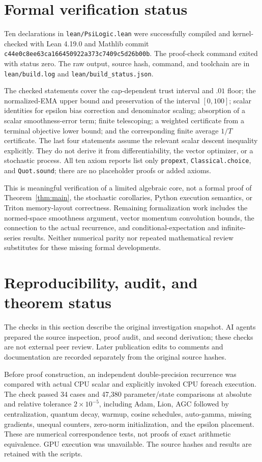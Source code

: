 \documentclass[11pt]{article}
\theoremstyle{definition}
\theoremstyle{remark}
\begin{document}
\section{Formal verification status}\label{sec:formal}
Ten declarations in \texttt{lean/PsiLogic.lean} were successfully compiled and
kernel-checked with Lean 4.19.0 and Mathlib commit
\texttt{c44e0c8ee63ca166450922a373c7409c5d26b00b}. The proof-check command exited
with status zero. The raw output, source hash, command, and toolchain are in
\texttt{lean/build.log} and \texttt{lean/build\_status.json}.

The checked statements cover the cap-dependent trust interval and $.01$ floor;
the normalized-EMA upper bound and preservation of the interval $[0,100]$;
scalar identities for epsilon bias correction and denominator scaling;
absorption of a scalar smoothness-error term; finite telescoping; a weighted
certificate from a terminal objective lower bound; and the corresponding finite
average $1/T$ certificate. The last four statements assume the relevant scalar
descent inequality explicitly. They do not derive it from differentiability,
the vector optimizer, or a stochastic process. All ten axiom reports list only
\texttt{propext}, \texttt{Classical.choice}, and \texttt{Quot.sound}; there are
no placeholder proofs or added axioms.

This is meaningful verification of a limited algebraic core, not a formal
proof of Theorem~\ref{thm:main}, the stochastic corollaries, Python execution
semantics, or Triton memory-layout correctness. Remaining formalization work
includes the normed-space smoothness argument, vector momentum convolution
bounds, the connection to the actual recurrence, and conditional-expectation
and infinite-series results. Neither numerical parity nor repeated mathematical
review substitutes for these missing formal developments.

\section{Reproducibility, audit, and theorem status}\label{sec:audit}
The checks in this section describe the original investigation snapshot.
AI agents prepared the source inspection, proof audit, and second derivation;
these checks are not external peer review. Later publication edits to comments
and documentation are recorded separately from the original source hashes.

Before proof construction, an independent double-precision recurrence was
compared with actual CPU scalar and explicitly invoked CPU foreach execution.
The check passed 34 cases and 47,380 parameter/state comparisons at absolute
and relative tolerance $2\times10^{-5}$, including Adam, Lion, AGC followed by
centralization, quantum decay, warmup, cosine schedules, auto-gamma, missing
gradients, unequal counters, zero-norm initialization, and the epsilon
placement. These are numerical correspondence tests, not proofs of exact
arithmetic equivalence. GPU execution was unavailable. The source hashes and
results are retained with the scripts.
\end{document}
